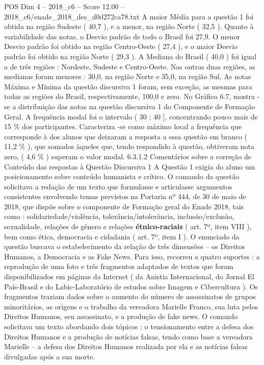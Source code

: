 \begin{textsample}{POS Dim 4 – 2018\_c6 – Score 12.00 – 2018\_c6/enade\_2018\_des\_d0d272ca78.txt}
A maior Média para a questão 1 foi obtida na região Sudeste ( 40,7 ), e a menor, na região Norte ( 32,5 ).
Quanto à variabilidade das notas, o Desvio padrão de todo o Brasil foi 27,9.
O menor Desvio padrão foi obtido na região Centro-Oeste ( 27,4 ), e o maior Desvio padrão foi obtido na região Norte ( 29,3 ).
A Mediana do Brasil ( 40,0 ) foi igual a de três regiões : Nordeste, Sudeste e Centro-Oeste.
Nas outras duas regiões, as medianas foram menores : 30,0, na região Norte e 35,0, na região Sul.
As notas Máxima e Mínima da questão discursiva 1 foram, sem exceção, as mesmas para todas as regiões do Brasil, respectivamente, 100,0 e zero.
No Gráfico 6.7, mostra -se a distribuição das notas na questão discursiva 1 do Componente de Formação Geral.
A frequência modal foi o intervalo ( 30 ; 40 ], concentrando pouco mais de 15 \% dos participantes.
Caracteriza -se como máximo local a frequência que corresponde à dos alunos que deixaram a resposta a essa questão em branco ( 11,2 \% ), que somados àqueles que, tendo respondido à questão, obtiveram nota zero, ( 4,6 \% ) superam o valor modal. 6.3.1.2 Comentários sobre a correção de Conteúdo das respostas à Questão Discursiva 1 A Questão 1 exigia do aluno um posicionamento sobre conteúdo humanista e crítico.
O comando da questão solicitava a redação de um texto que formulasse e articulasse argumentos consistentes envolvendo temas previstos na Portaria nº 444, de 30 de maio de 2018, que dispõe sobre o componente de Formação geral do Enade 2018, tais como : solidariedade/violência, tolerância/intolerância, inclusão/exclusão, sexualidade, relações de gênero e relações \textbf{étnico-raciais} ( art. 7º, item VIII ), bem como ética, democracia e cidadania ( art. 7º, item I ).
O enunciado da questão buscava o estabelecimento da relação de três dimensões – os Direitos Humanos, a Democracia e as Fake News.
Para isso, recorreu a quatro suportes : a reprodução de uma foto e três fragmentos adaptados de textos que foram disponibilizados em páginas da Internet ( da Anistia Internacional, do Jornal El País-Brasil e do Labic-Laboratório de estudos sobre Imagem e Cibercultura ).
Os fragmentos traziam dados sobre o aumento do número de assassinatos de grupos minoritários, as origens e o trabalho da vereadora Marielle Franco, sua luta pelos Direitos Humanos, seu assassinato, e a produção de fake news.
O comando solicitava um texto abordando dois tópicos : o tensionamento entre a defesa dos Direitos Humanos e a produção de notícias falsas, tendo como base a vereadora Marielle – a defesa dos Direitos Humanos realizada por ela e as notícias falsas divulgadas após a sua morte.

\end{textsample}
